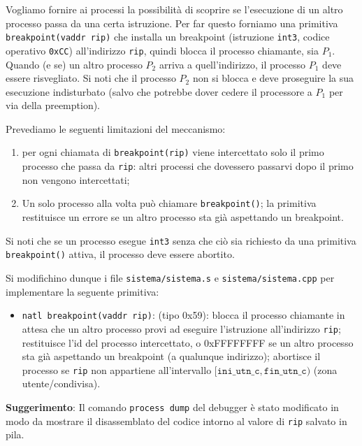 Vogliamo fornire ai processi la possibilit\`a di scoprire se l'esecuzione di un altro processo passa da una certa istruzione.
Per far questo forniamo una primitiva \verb|breakpoint(vaddr rip)| che installa un breakpoint (istruzione \verb|int3|, codice operativo \verb|0xCC|) 
all'indirizzo \verb|rip|, quindi blocca il processo chiamante, sia $P_1$. Quando (e se) un altro processo $P_2$ arriva a quell'indirizzo,
il processo $P_1$ deve essere risvegliato. Si noti che il processo $P_2$ non si blocca e deve proseguire la sua esecuzione
indisturbato (salvo che potrebbe dover cedere il processore a $P_1$ per via della preemption).

Prevediamo le seguenti limitazioni del meccanismo:
\begin{enumerate}
\item per ogni chiamata di \verb|breakpoint(rip)| viene intercettato solo il primo processo che passa da \verb|rip|: altri processi che dovessero passarvi dopo il primo non
vengono intercettati;
\item Un solo processo alla volta pu\`o chiamare \verb|breakpoint()|; la primitiva restituisce un errore se un altro processo sta gi\`a aspettando un breakpoint.
\end{enumerate}

Si noti che se un processo esegue \verb|int3| senza che ci\`o sia richiesto da una primitiva \verb|breakpoint()| attiva, il processo
deve essere abortito.



Si modifichino dunque i file \verb|sistema/sistema.s| e \verb|sistema/sistema.cpp| per implementare la seguente primitiva:
\begin{itemize}
\item 	\verb|natl breakpoint(vaddr rip)|: (tipo 0x59): blocca il processo chiamante in attesa che un altro processo provi ad eseguire
	l'istruzione all'indirizzo \verb|rip|; restituisce l'id del processo intercettato, o 0xFFFFFFFF se un altro processo sta gi\`a
	  aspettando un breakpoint (a qualunque indirizzo);
      abortisce il processo se \verb|rip| non appartiene all'intervallo $[\mathtt{ini\_utn\_c}, \mathtt{fin\_utn\_c})$ (zona utente/condivisa).
\end{itemize}

{\bf Suggerimento}: Il comando \verb|process dump| del debugger \`e stato modificato in modo da mostrare il disassemblato del codice
intorno al valore di \verb|rip| salvato in pila.
